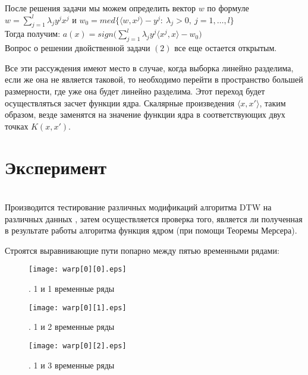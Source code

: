 \documentclass[12pt, twoside]{article}
\begin{document}
После решения задачи мы можем определить вектор $w$ по формуле $w  = \sum\limits_{j=1}^l\lambda_jy^jx^j$ и $w_0 = med\{\langle w, x^j \rangle  - y^j: \ \lambda_j > 0, \ j = 1, \ldots, l\}$\\

Тогда получим: $a(x) = sign \big(\sum\limits_{j=1}^l\lambda_jy^j\langle x^j,x \rangle - w_0 \big)$\\

Вопрос о решении двойственной задачи $(2)$ все еще остается открытым.

Все эти рассуждения имеют место в случае, когда выборка линейно разделима, если же она не является таковой, то необходимо перейти в пространство большей размерности, где уже она будет линейно разделима. Этот переход будет осуществляться засчет функции ядра. Скалярные произведения $\langle x,x' \rangle$, таким образом, везде заменятся на значение функции ядра в соответствующих двух точках $K(x,x')$.


\section{Экcперимент}\\
Производится тестирование различных модификаций алгоритма DTW на различных данных \cite{Data}, затем осуществляется проверка того, является ли полученная в результате работы алгоритма функция ядром (при помощи Теоремы Мерсера). 

Строятся выравнивающие пути попарно между пятью временными рядами:

\begin{figure}[H]
\centering
\begin{minipage}{0.66\textwidth}
\texttt{[image: warp[0][0].eps]}
\end{minipage}%
\caption{ . 1 и 1 временные ряды}
\label{fig:2}
\end{figure}

\begin{figure}[H]
\centering
\begin{minipage}{0.66\textwidth}
\texttt{[image: warp[0][1].eps]}
\end{minipage}%
\caption{ . 1 и 2 временные ряды}
\label{fig:2}
\end{figure}

\begin{figure}[H]
\centering
\begin{minipage}{0.66\textwidth}
\texttt{[image: warp[0][2].eps]}
\end{minipage}%
\caption{ . 1 и 3 временные ряды}
\label{fig:2}
\end{figure}
\end{document}
